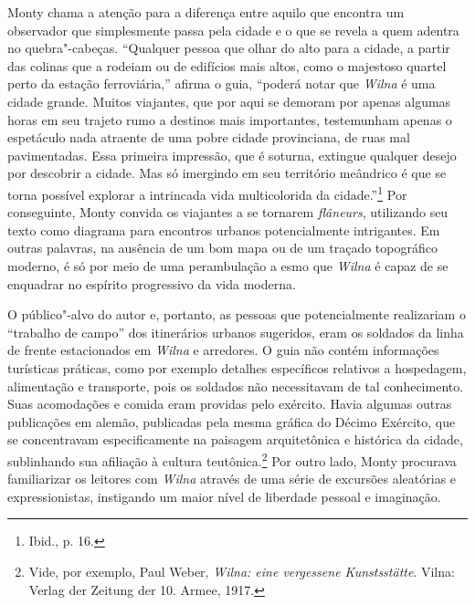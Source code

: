 Monty chama a atenção para a diferença entre aquilo que encontra um
observador que simplesmente passa pela cidade e o que se revela a quem
adentra no quebra"-cabeças. ``Qualquer pessoa que olhar do alto para a
cidade, a partir das colinas que a rodeiam ou de edifícios mais altos,
como o majestoso quartel perto da estação ferroviária,'' afirma o guia,
``poderá notar que \textit{Wilna} é uma cidade grande. Muitos viajantes, que por
aqui se demoram por apenas algumas horas em seu trajeto rumo a destinos
mais importantes, testemunham apenas o espetáculo nada atraente de uma
pobre cidade provinciana, de ruas mal pavimentadas. Essa primeira
impressão, que é soturna, extingue qualquer desejo por descobrir a
cidade. Mas só imergindo em seu território meândrico é que se torna
possível explorar a intrincada vida multicolorida da cidade.''\footnote{Ibid., p. 16.} Por conseguinte, Monty convida os viajantes a se tornarem \textit{flâneurs}, utilizando seu texto como diagrama para encontros
urbanos potencialmente intrigantes. Em outras palavras, na ausência de
um bom mapa ou de um traçado topográfico moderno, é só por meio de uma
perambulação a esmo que \textit{Wilna} é capaz de se enquadrar no espírito
progressivo da vida moderna.

O público"-alvo do autor e, portanto, as pessoas que potencialmente
realizariam o ``trabalho de campo'' dos itinerários urbanos sugeridos,
eram os soldados da linha de frente estacionados em \textit{Wilna} e arredores. O
guia não contém informações turísticas práticas, como por exemplo
detalhes específicos relativos a hospedagem, alimentação e transporte,
pois os soldados não necessitavam de tal conhecimento. Suas acomodações
e comida eram providas pelo exército. Havia algumas outras publicações
em alemão, publicadas pela mesma gráfica do Décimo Exército, que se
concentravam especificamente na paisagem arquitetônica e histórica da
cidade, sublinhando sua afiliação à cultura teutônica.\footnote{Vide, por exemplo, Paul Weber, \textit{Wilna: eine vergessene Kunstsstätte}. Vilna: Verlag der Zeitung der 10. Armee, 1917.} Por outro lado, Monty procurava familiarizar os leitores com \textit{Wilna} através de uma série de
excursões aleatórias e expressionistas, instigando um maior nível de
liberdade pessoal e imaginação.

